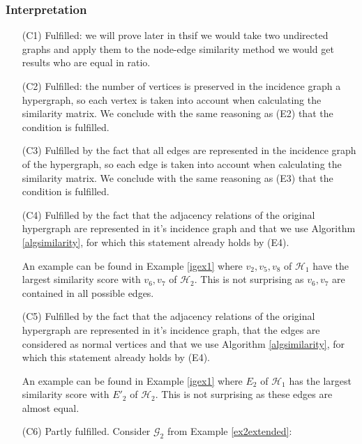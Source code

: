 \documentclass[a4paper,11pt]{report}
\newcommand{\hgraf}{\mathcal{G}}
\newcommand{\hgrafeen}{\mathcal{H}}
\begin{document}
\subsubsection{Interpretation}

\begin{itemize}
  \item[(C1)] Fulfilled: we will prove later in thsif we would take two undirected graphs and apply them to the node-edge similarity method
  we would get results who are equal in ratio.  
    \item[(C2)] Fulfilled: the number of vertices is preserved in the incidence graph a hypergraph, so each vertex is taken into account when calculating the similarity matrix. We conclude with the same reasoning as (E2) that the condition is fulfilled.
    \item[(C3)] Fulfilled by the fact that all edges are 
    represented in the incidence graph of the hypergraph, so each edge is taken into account when calculating the similarity matrix. We conclude with the same reasoning as (E3) that the condition is fulfilled.

  \item[(C4)] Fulfilled by the fact that the adjacency relations of the original hypergraph are represented in it's 
  incidence graph and that we use Algorithm \ref{algsimilarity}, for which this 
  statement already holds by (E4).
  
  An example can be found in Example \ref{igex1} where $v_2, v_5, v_8$ of $\hgrafeen_1$ 
  have the largest similarity score with $v_6, v_7$ of $\hgrafeen_2$. This is 
  not surprising as $v_6, v_7$ are contained in all possible edges.
  \item[(C5)] Fulfilled by the fact that the adjacency relations of the original hypergraph are represented in it's 
  incidence graph, that the edges are considered as normal vertices and that we use Algorithm \ref{algsimilarity}, for which this 
  statement already holds by (E4).
  
  
  An example can be found in Example \ref{igex1} where $E_2$ of $\hgrafeen_1$ 
  has the largest similarity score with $E'_2$ of $\hgrafeen_2$. This is 
  not surprising as these edges are almost equal.


  \item[(C6)] Partly fulfilled. Consider $\hgraf_2$ from Example \ref{ex2extended}:

       \begin{center}
\end{center}
\end{itemize}
\end{document}
